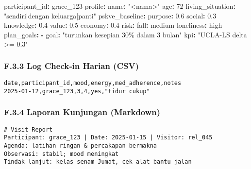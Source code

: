 \documentclass[
  letterpaper,
  DIV=11,
  numbers=noendperiod]{scrartcl}
\newenvironment{Shaded}{\begin{snugshade}}{\end{snugshade}}
\newcommand{\AttributeTok}[1]{\textcolor[rgb]{0.40,0.45,0.13}{#1}}
\newcommand{\DecValTok}[1]{\textcolor[rgb]{0.68,0.00,0.00}{#1}}
\newcommand{\FloatTok}[1]{\textcolor[rgb]{0.68,0.00,0.00}{#1}}
\newcommand{\FunctionTok}[1]{\textcolor[rgb]{0.28,0.35,0.67}{#1}}
\newcommand{\KeywordTok}[1]{\textcolor[rgb]{0.00,0.23,0.31}{\textbf{#1}}}
\newcommand{\StringTok}[1]{\textcolor[rgb]{0.13,0.47,0.30}{#1}}
\begin{document}
\begin{Shaded}
\begin{Highlighting}[]
\FunctionTok{participant\_id}\KeywordTok{:}\AttributeTok{ grace\_123}
\FunctionTok{profile}\KeywordTok{:}
\AttributeTok{  }\FunctionTok{name}\KeywordTok{:}\AttributeTok{ }\StringTok{"\textless{}nama\textgreater{}"}
\AttributeTok{  }\FunctionTok{age}\KeywordTok{:}\AttributeTok{ }\DecValTok{72}
\AttributeTok{  }\FunctionTok{living\_situation}\KeywordTok{:}\AttributeTok{ }\StringTok{"sendiri|dengan keluarga|panti"}
\FunctionTok{pskve\_baseline}\KeywordTok{:}
\AttributeTok{  }\FunctionTok{purpose}\KeywordTok{:}\AttributeTok{ }\FloatTok{0.6}
\AttributeTok{  }\FunctionTok{social}\KeywordTok{:}\AttributeTok{ }\FloatTok{0.3}
\AttributeTok{  }\FunctionTok{knowledge}\KeywordTok{:}\AttributeTok{ }\FloatTok{0.4}
\AttributeTok{  }\FunctionTok{value}\KeywordTok{:}\AttributeTok{ }\FloatTok{0.5}
\AttributeTok{  }\FunctionTok{economy}\KeywordTok{:}\AttributeTok{ }\FloatTok{0.4}
\FunctionTok{risk}\KeywordTok{:}
\AttributeTok{  }\FunctionTok{fall}\KeywordTok{:}\AttributeTok{ medium}
\AttributeTok{  }\FunctionTok{loneliness}\KeywordTok{:}\AttributeTok{ high}
\FunctionTok{plan\_goals}\KeywordTok{:}
\AttributeTok{  }\KeywordTok{{-}}\AttributeTok{ }\FunctionTok{goal}\KeywordTok{:}\AttributeTok{ }\StringTok{"turunkan kesepian 30\% dalam 3 bulan"}
\AttributeTok{    }\FunctionTok{kpi}\KeywordTok{:}\AttributeTok{ }\StringTok{"UCLA{-}LS delta \textgreater{}= 0.3"}
\end{Highlighting}
\end{Shaded}

\subsubsection{F.3.3 Log Check‑in Harian
(CSV)}\label{f.3.3-log-checkin-harian-csv}

\begin{verbatim}
date,participant_id,mood,energy,med_adherence,notes
2025-01-12,grace_123,3,4,yes,"tidur cukup"
\end{verbatim}

\subsubsection{F.3.4 Laporan Kunjungan
(Markdown)}\label{f.3.4-laporan-kunjungan-markdown}

\begin{verbatim}
# Visit Report
Participant: grace_123 | Date: 2025-01-15 | Visitor: rel_045
Agenda: latihan ringan & percakapan bermakna
Observasi: stabil; mood meningkat
Tindak lanjut: kelas senam Jumat, cek alat bantu jalan
\end{verbatim}
\end{document}

